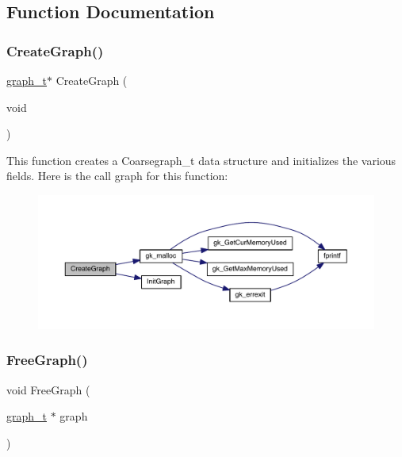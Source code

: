 \subsection{Function Documentation}
\mbox{\label{a00852_a01903fa912de9fc7f01dace993a3fc85}} 
\subsubsection{\texorpdfstring{Create\+Graph()}{CreateGraph()}}
{\footnotesize\ttfamily \hyperlink{a00734}{graph\+\_\+t}$\ast$ Create\+Graph (\begin{DoxyParamCaption}\item[{void}]{ }\end{DoxyParamCaption})}

This function creates a Coarsegraph\+\_\+t data structure and initializes the various fields. Here is the call graph for this function\+:\nopagebreak
\begin{figure}[H]
\begin{center}
\leavevmode
\includegraphics[width=350pt]{a00852_a01903fa912de9fc7f01dace993a3fc85_cgraph}
\end{center}
\end{figure}
\mbox{\label{a00852_a583ba60fc42c1592f69587a1ae9c94d4}} 
\subsubsection{\texorpdfstring{Free\+Graph()}{FreeGraph()}}
{\footnotesize\ttfamily void Free\+Graph (\begin{DoxyParamCaption}\item[{\hyperlink{a00734}{graph\+\_\+t} $\ast$}]{graph }\end{DoxyParamCaption})}

